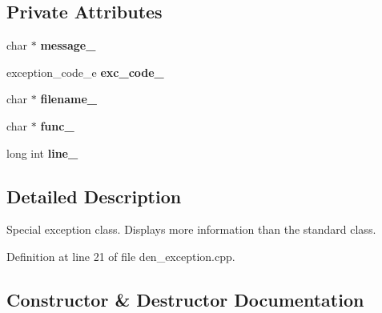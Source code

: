 \subsection*{Private Attributes}
\begin{DoxyCompactItemize}
\item 
\mbox{\label{classDenException_ac00d70d94b80bee04c3bd1001dcb9b59}} 
char $\ast$ {\bfseries message\+\_\+}
\item 
\mbox{\label{classDenException_a208f77c9eef3ca77c9856d53d61f6521}} 
exception\+\_\+code\+\_\+e {\bfseries exc\+\_\+code\+\_\+}
\item 
\mbox{\label{classDenException_af1a100cc67470e358b9f372cbc157830}} 
char $\ast$ {\bfseries filename\+\_\+}
\item 
\mbox{\label{classDenException_abbaa230a9b0fe68e0ef7eaad171f79a4}} 
char $\ast$ {\bfseries func\+\_\+}
\item 
\mbox{\label{classDenException_a5b7be04f7a34c9944e0d0e934e88ef26}} 
long int {\bfseries line\+\_\+}
\end{DoxyCompactItemize}


\subsection{Detailed Description}
Special exception class. Displays more information than the standard class. 

Definition at line 21 of file den\+\_\+exception.\+cpp.



\subsection{Constructor \& Destructor Documentation}
\mbox{\label{classDenException_a126de088ce459641b0793bd754f4d171}} 
